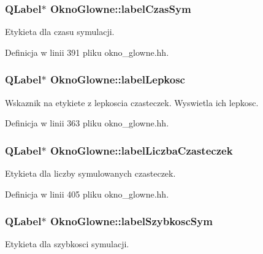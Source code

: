 \hypertarget{class_okno_glowne_aca07e1dc5cbe30d6952f9b952073bb79}{
\subsubsection[{label\-Czas\-Sym}]{\setlength{\rightskip}{0pt plus 5cm}Q\-Label$\ast$ Okno\-Glowne\-::label\-Czas\-Sym\hspace{0.3cm}{\ttfamily [private]}}}\label{class_okno_glowne_aca07e1dc5cbe30d6952f9b952073bb79}
Etykieta dla czasu symulacji. 

Definicja w linii 391 pliku okno\-\_\-glowne.\-hh.

\hypertarget{class_okno_glowne_ae46bf7cd60af2ead74dc27ee7d761868}{
\subsubsection[{label\-Lepkosc}]{\setlength{\rightskip}{0pt plus 5cm}Q\-Label$\ast$ Okno\-Glowne\-::label\-Lepkosc\hspace{0.3cm}{\ttfamily [private]}}}\label{class_okno_glowne_ae46bf7cd60af2ead74dc27ee7d761868}
Wskaznik na etykiete z lepkoscia czasteczek. Wyswietla ich lepkosc. 

Definicja w linii 363 pliku okno\-\_\-glowne.\-hh.

\hypertarget{class_okno_glowne_ab01460f1222d0ec2892abf21efb23078}{
\subsubsection[{label\-Liczba\-Czasteczek}]{\setlength{\rightskip}{0pt plus 5cm}Q\-Label$\ast$ Okno\-Glowne\-::label\-Liczba\-Czasteczek\hspace{0.3cm}{\ttfamily [private]}}}\label{class_okno_glowne_ab01460f1222d0ec2892abf21efb23078}
Etykieta dla liczby symulowanych czasteczek. 

Definicja w linii 405 pliku okno\-\_\-glowne.\-hh.

\hypertarget{class_okno_glowne_ad7b0708ffdf61f3bef1349cc353a6c4e}{
\subsubsection[{label\-Szybkosc\-Sym}]{\setlength{\rightskip}{0pt plus 5cm}Q\-Label$\ast$ Okno\-Glowne\-::label\-Szybkosc\-Sym\hspace{0.3cm}{\ttfamily [private]}}}\label{class_okno_glowne_ad7b0708ffdf61f3bef1349cc353a6c4e}
Etykieta dla szybkosci symulacji. 

